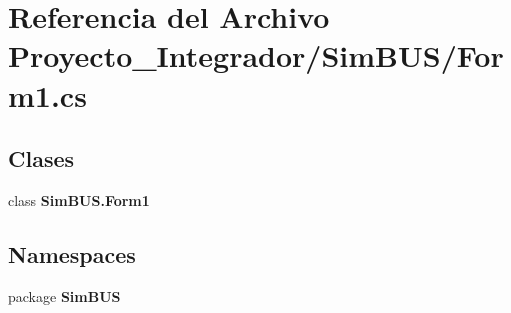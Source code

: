 \section{Referencia del Archivo Proyecto\-\_\-\-Integrador/\-Sim\-B\-U\-S/\-Form1.cs}
\label{_form1_8cs}
\subsection*{Clases}
\begin{DoxyCompactItemize}
\item 
class {\bf Sim\-B\-U\-S.\-Form1}
\end{DoxyCompactItemize}
\subsection*{Namespaces}
\begin{DoxyCompactItemize}
\item 
package {\bf Sim\-B\-U\-S}
\end{DoxyCompactItemize}
